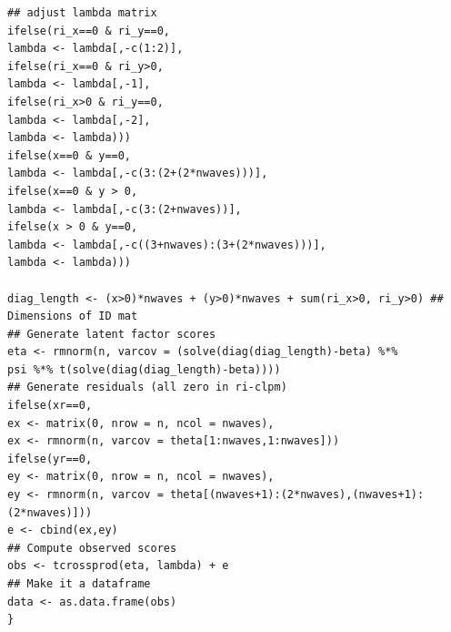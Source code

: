 \documentclass[
  english,
  man,floatsintext]{apa6}
\begin{document}
\begin{appendix}
\begin{verbatim}
## adjust lambda matrix
ifelse(ri_x==0 & ri_y==0,
lambda <- lambda[,-c(1:2)],
ifelse(ri_x==0 & ri_y>0,
lambda <- lambda[,-1],
ifelse(ri_x>0 & ri_y==0,
lambda <- lambda[,-2],
lambda <- lambda)))
ifelse(x==0 & y==0,
lambda <- lambda[,-c(3:(2+(2*nwaves)))],
ifelse(x==0 & y > 0,
lambda <- lambda[,-c(3:(2+nwaves))],
ifelse(x > 0 & y==0,
lambda <- lambda[,-c((3+nwaves):(3+(2*nwaves)))],
lambda <- lambda)))

diag_length <- (x>0)*nwaves + (y>0)*nwaves + sum(ri_x>0, ri_y>0) ## Dimensions of ID mat
## Generate latent factor scores
eta <- rmnorm(n, varcov = (solve(diag(diag_length)-beta) %*%
psi %*% t(solve(diag(diag_length)-beta))))
## Generate residuals (all zero in ri-clpm)
ifelse(xr==0,
ex <- matrix(0, nrow = n, ncol = nwaves),
ex <- rmnorm(n, varcov = theta[1:nwaves,1:nwaves]))
ifelse(yr==0,
ey <- matrix(0, nrow = n, ncol = nwaves),
ey <- rmnorm(n, varcov = theta[(nwaves+1):(2*nwaves),(nwaves+1):(2*nwaves)]))
e <- cbind(ex,ey)
## Compute observed scores
obs <- tcrossprod(eta, lambda) + e
## Make it a dataframe
data <- as.data.frame(obs)
}
\end{verbatim}
\end{appendix}
\end{document}
